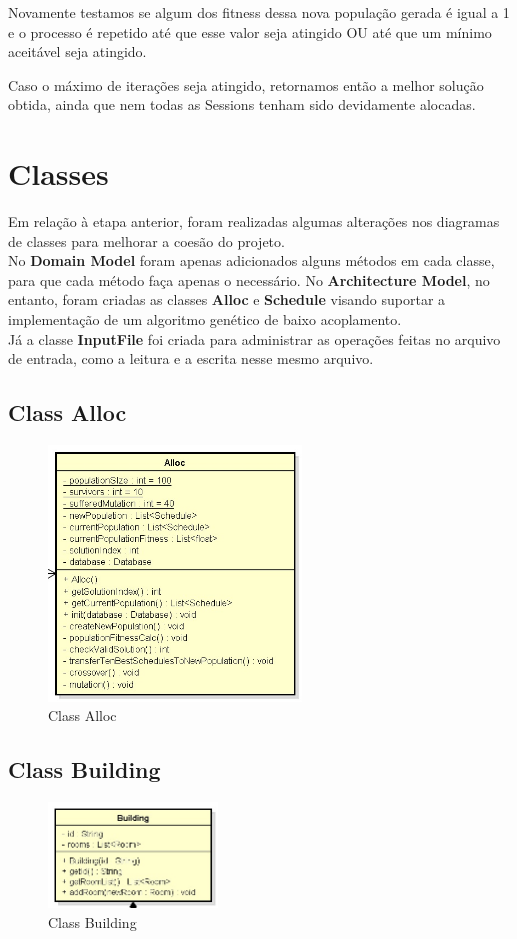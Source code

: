 \documentclass[a4paper]{article}
\begin{document}
Novamente testamos se algum dos fitness dessa nova população gerada é igual a 1 e o processo é repetido até que esse valor seja atingido OU até que um mínimo aceitável seja atingido.

Caso o máximo de iterações seja atingido, retornamos então a melhor solução obtida, ainda que nem todas as Sessions tenham sido devidamente alocadas.

\section{Classes}
Em relação à etapa anterior, foram realizadas algumas alterações nos diagramas de classes para melhorar a coesão do projeto. \\
No \textbf{Domain Model} foram apenas adicionados alguns métodos em cada classe, para que cada método faça apenas o necessário.
No \textbf{Architecture Model}, no entanto, foram criadas as classes \textbf{Alloc} e \textbf{Schedule} visando suportar a implementação de um algoritmo genético de baixo acoplamento. \\
Já a classe \textbf{InputFile} foi criada para administrar as operações feitas no arquivo de entrada, como a leitura e a escrita nesse mesmo arquivo.

\subsection{Class Alloc}
\begin{figure}[H]
\centering
\includegraphics[width=0.6\textwidth]{Alloc.jpg}
\caption{\label{fig:alloc}Class Alloc}
\end{figure}


\subsection{Class Building}
\begin{figure}[H]
\centering
\includegraphics[width=0.4\textwidth]{Building.jpg}
\caption{\label{fig:building}Class Building}
\end{figure}
\end{document}

